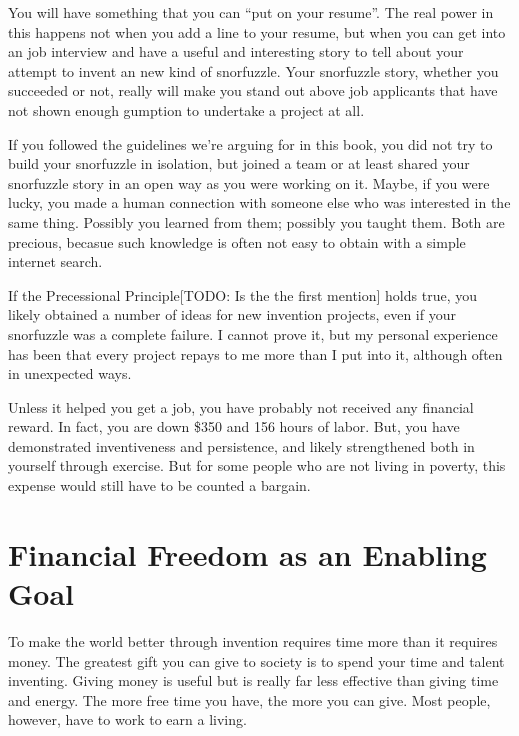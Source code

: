 \documentclass[
	fontsize=10pt, %
	twoside=false, %
	secnumdepth=1, %
]{kaobook}
\begin{document}
You will have something that you can ``put on your resume''.
The real power in this happens not when you add a line to your resume,
but when you can get into an job interview and have a useful and
interesting story to tell about your attempt to invent an new kind
of snorfuzzle. Your snorfuzzle story, whether you succeeded or not,
really will make you stand out above job applicants that have not
shown enough gumption to undertake a project at all.

If you followed the guidelines we're
arguing for in this book, you did not try to build your snorfuzzle
in isolation, but joined a team or at least shared your snorfuzzle story
in an open way as you were working on it.
Maybe, if you were lucky,
you made a human connection with someone else who was interested in
the same thing.
Possibly you learned from them; possibly you taught them.
Both are precious, becasue such knowledge is often
not easy to obtain with a simple internet search.

If the Precessional Principle[TODO: Is the the first mention] holds true, you likely obtained a
number of ideas for new invention projects, even if your snorfuzzle
was a complete failure. I cannot prove it, but my personal experience
has been that every project repays to me more than I put into it,
although often in unexpected ways.

Unless it helped you get a job, you have probably not received any
financial reward. In fact, you are down \$350 and 156 hours of labor.
But, you have demonstrated inventiveness and persistence, and likely
strengthened both in yourself through exercise.
But for some people who are not living in poverty, this expense would still have to be counted a bargain.

\chapter{Financial Freedom as an Enabling Goal}

To make the world better through invention requires time more
than it requires money.
The greatest gift you can give to society
is to spend your time and talent inventing.
Giving money is useful but
is really far less effective than giving time and energy.
The more free time you have, the more you can give.
Most people, however,
have to work to earn a living.
\end{document}
